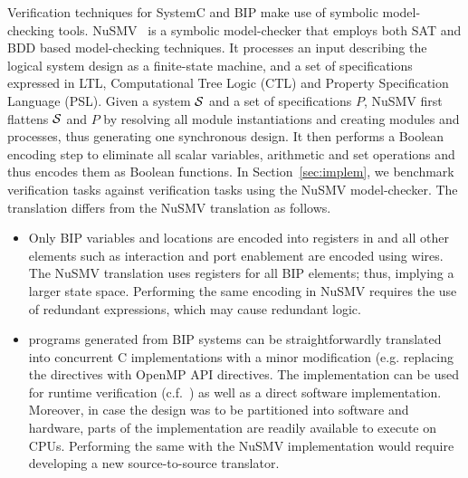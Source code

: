 Verification techniques for SystemC and BIP make use of symbolic model-checking tools. 
NuSMV~\cite{nusmv} is a symbolic model-checker that employs both 
SAT and BDD based model-checking techniques. It processes an input 
describing the logical system design as a finite-state machine, and a set of specifications
expressed in LTL, Computational Tree Logic (CTL) and Property Specification Language (PSL).
Given a system $\mathcal{S}$ and a set of specifications $P$, NuSMV first flattens $\mathcal{S}$ and $P$ by 
resolving all module instantiations and creating modules and processes, thus generating one 
synchronous design. It then performs a Boolean encoding step to eliminate all scalar variables, 
arithmetic and set operations and thus encodes them as Boolean functions.
In Section~\ref{sec:implem}, we benchmark \biptool{} verification tasks 
against verification tasks using the NuSMV model-checker. 
The \caig translation differs from the NuSMV translation as follows. 
%
\begin{itemize}
  \item
Only BIP variables and locations are encoded into registers in 
\caig and all 
other elements such as interaction and port enablement  
are encoded using wires. 
The NuSMV translation uses registers for all BIP elements;
thus, implying a larger state space. 
Performing the same encoding in NuSMV requires the use of redundant 
expressions, which may cause redundant logic. 
\item 
%
 \caig programs generated from BIP systems can be straightforwardly
 translated into concurrent C implementations with a minor modification (e.g. replacing the  
    directives with OpenMP API directives.
%
 The implementation can be used for runtime verification (c.f.~\cite{FalconeHR13}) as well as a direct
 software implementation.  
 Moreover, in case the design was to be partitioned into software and hardware, 
 parts of the implementation are readily available to execute on CPUs. 
 Performing the same with the NuSMV implementation would require developing 
 a new source-to-source translator. 
\end{itemize}



